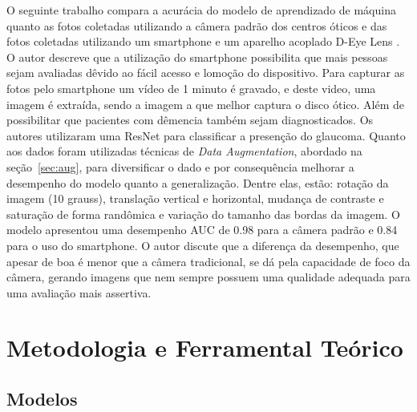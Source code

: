 \documentclass[ %
	msc, %
	portugues %
]{../ppgccufmg}
\begin{document}
    O seguinte trabalho compara a acurácia do modelo de aprendizado
    de máquina quanto as fotos coletadas utilizando a câmera padrão dos centros óticos e das fotos
    coletadas utilizando um smartphone e um aparelho acoplado D-Eye Lens \citep{Nakahara587}. O autor descreve que a
    utilização do smartphone possibilita que mais pessoas sejam avaliadas dêvido ao fácil acesso e
    lomoção do dispositivo. Para capturar as fotos pelo smartphone um vídeo de 1 minuto é gravado, e
    deste video, uma imagem é extraída, sendo a imagem a que melhor captura o disco ótico.
    Além de possibilitar que pacientes com dêmencia também sejam diagnosticados. Os autores utilizaram uma
    ResNet para classificar a presenção do glaucoma. Quanto aos dados foram utilizadas técnicas de \textit{Data
    Augmentation}, abordado na seção~\ref{sec:aug}, para diversificar o dado e por consequência melhorar a desempenho do
    modelo quanto a generalização. Dentre elas, estão: rotação da imagem (10 grauss),
    translação vertical e horizontal, mudança de contraste e saturação de forma randômica e variação
    do tamanho das bordas da imagem. O modelo apresentou uma desempenho AUC de 0.98 para a câmera
    padrão e 0.84 para o uso do smartphone. O autor discute que a diferença da desempenho, que
    apesar de boa é menor que a câmera tradicional, se dá pela capacidade de foco da câmera, gerando
    imagens que nem sempre possuem uma qualidade adequada para uma avaliação mais assertiva.

	\chapter{Metodologia e Ferramental Teórico}\label{method}

    \section{Modelos}\label{sec:model}
\end{document}
